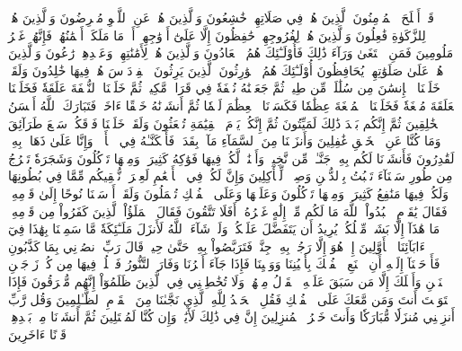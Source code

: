 قَدۡ أَفۡلَحَ ٱلۡمُؤۡمِنُونَ
ٱلَّذِينَ هُمۡ فِي صَلَاتِهِمۡ خَٰشِعُونَ
وَٱلَّذِينَ هُمۡ عَنِ ٱللَّغۡوِ مُعۡرِضُونَ
وَٱلَّذِينَ هُمۡ لِلزَّكَوٰةِ فَٰعِلُونَ
وَٱلَّذِينَ هُمۡ لِفُرُوجِهِمۡ حَٰفِظُونَ
إِلَّا عَلَىٰٓ أَزۡوَٰجِهِمۡ أَوۡ مَا مَلَكَتۡ أَيۡمَٰنُهُمۡ فَإِنَّهُمۡ غَيۡرُ مَلُومِينَ
فَمَنِ ٱبۡتَغَىٰ وَرَآءَ ذَٰلِكَ فَأُوْلَـٰٓئِكَ هُمُ ٱلۡعَادُونَ
وَٱلَّذِينَ هُمۡ لِأَمَٰنَٰتِهِمۡ وَعَهۡدِهِمۡ رَٰعُونَ
وَٱلَّذِينَ هُمۡ عَلَىٰ صَلَوَٰتِهِمۡ يُحَافِظُونَ
أُوْلَـٰٓئِكَ هُمُ ٱلۡوَٰرِثُونَ
ٱلَّذِينَ يَرِثُونَ ٱلۡفِرۡدَوۡسَ هُمۡ فِيهَا خَٰلِدُونَ
وَلَقَدۡ خَلَقۡنَا ٱلۡإِنسَٰنَ مِن سُلَٰلَةٖ مِّن طِينٖ
ثُمَّ جَعَلۡنَٰهُ نُطۡفَةٗ فِي قَرَارٖ مَّكِينٖ
ثُمَّ خَلَقۡنَا ٱلنُّطۡفَةَ عَلَقَةٗ فَخَلَقۡنَا ٱلۡعَلَقَةَ مُضۡغَةٗ فَخَلَقۡنَا ٱلۡمُضۡغَةَ عِظَٰمٗا فَكَسَوۡنَا ٱلۡعِظَٰمَ لَحۡمٗا ثُمَّ أَنشَأۡنَٰهُ خَلۡقًا ءَاخَرَۚ فَتَبَارَكَ ٱللَّهُ أَحۡسَنُ ٱلۡخَٰلِقِينَ
ثُمَّ إِنَّكُم بَعۡدَ ذَٰلِكَ لَمَيِّتُونَ
ثُمَّ إِنَّكُمۡ يَوۡمَ ٱلۡقِيَٰمَةِ تُبۡعَثُونَ
وَلَقَدۡ خَلَقۡنَا فَوۡقَكُمۡ سَبۡعَ طَرَآئِقَ وَمَا كُنَّا عَنِ ٱلۡخَلۡقِ غَٰفِلِينَ
وَأَنزَلۡنَا مِنَ ٱلسَّمَآءِ مَآءَۢ بِقَدَرٖ فَأَسۡكَنَّـٰهُ فِي ٱلۡأَرۡضِۖ وَإِنَّا عَلَىٰ ذَهَابِۭ بِهِۦ لَقَٰدِرُونَ
فَأَنشَأۡنَا لَكُم بِهِۦ جَنَّـٰتٖ مِّن نَّخِيلٖ وَأَعۡنَٰبٖ لَّكُمۡ فِيهَا فَوَٰكِهُ كَثِيرَةٞ وَمِنۡهَا تَأۡكُلُونَ
وَشَجَرَةٗ تَخۡرُجُ مِن طُورِ سَيۡنَآءَ تَنۢبُتُ بِٱلدُّهۡنِ وَصِبۡغٖ لِّلۡأٓكِلِينَ
وَإِنَّ لَكُمۡ فِي ٱلۡأَنۡعَٰمِ لَعِبۡرَةٗۖ نُّسۡقِيكُم مِّمَّا فِي بُطُونِهَا وَلَكُمۡ فِيهَا مَنَٰفِعُ كَثِيرَةٞ وَمِنۡهَا تَأۡكُلُونَ
وَعَلَيۡهَا وَعَلَى ٱلۡفُلۡكِ تُحۡمَلُونَ
وَلَقَدۡ أَرۡسَلۡنَا نُوحًا إِلَىٰ قَوۡمِهِۦ فَقَالَ يَٰقَوۡمِ ٱعۡبُدُواْ ٱللَّهَ مَا لَكُم مِّنۡ إِلَٰهٍ غَيۡرُهُۥٓۚ أَفَلَا تَتَّقُونَ
فَقَالَ ٱلۡمَلَؤُاْ ٱلَّذِينَ كَفَرُواْ مِن قَوۡمِهِۦ مَا هَٰذَآ إِلَّا بَشَرٞ مِّثۡلُكُمۡ يُرِيدُ أَن يَتَفَضَّلَ عَلَيۡكُمۡ وَلَوۡ شَآءَ ٱللَّهُ لَأَنزَلَ مَلَـٰٓئِكَةٗ مَّا سَمِعۡنَا بِهَٰذَا فِيٓ ءَابَآئِنَا ٱلۡأَوَّلِينَ
إِنۡ هُوَ إِلَّا رَجُلُۢ بِهِۦ جِنَّةٞ فَتَرَبَّصُواْ بِهِۦ حَتَّىٰ حِينٖ
قَالَ رَبِّ ٱنصُرۡنِي بِمَا كَذَّبُونِ
فَأَوۡحَيۡنَآ إِلَيۡهِ أَنِ ٱصۡنَعِ ٱلۡفُلۡكَ بِأَعۡيُنِنَا وَوَحۡيِنَا فَإِذَا جَآءَ أَمۡرُنَا وَفَارَ ٱلتَّنُّورُ فَٱسۡلُكۡ فِيهَا مِن كُلّٖ زَوۡجَيۡنِ ٱثۡنَيۡنِ وَأَهۡلَكَ إِلَّا مَن سَبَقَ عَلَيۡهِ ٱلۡقَوۡلُ مِنۡهُمۡۖ وَلَا تُخَٰطِبۡنِي فِي ٱلَّذِينَ ظَلَمُوٓاْ إِنَّهُم مُّغۡرَقُونَ
فَإِذَا ٱسۡتَوَيۡتَ أَنتَ وَمَن مَّعَكَ عَلَى ٱلۡفُلۡكِ فَقُلِ ٱلۡحَمۡدُ لِلَّهِ ٱلَّذِي نَجَّىٰنَا مِنَ ٱلۡقَوۡمِ ٱلظَّـٰلِمِينَ
وَقُل رَّبِّ أَنزِلۡنِي مُنزَلٗا مُّبَارَكٗا وَأَنتَ خَيۡرُ ٱلۡمُنزِلِينَ
إِنَّ فِي ذَٰلِكَ لَأٓيَٰتٖ وَإِن كُنَّا لَمُبۡتَلِينَ
ثُمَّ أَنشَأۡنَا مِنۢ بَعۡدِهِمۡ قَرۡنًا ءَاخَرِينَ
